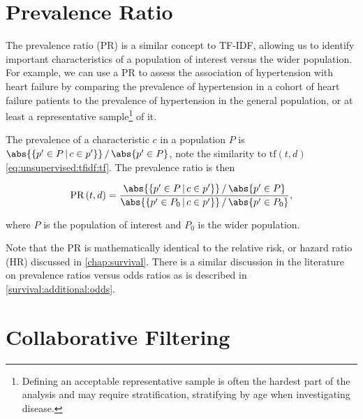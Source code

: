 \section{Prevalence Ratio}
\label{misc:PrevalenceRatio}

The prevalence ratio (PR) is a similar concept to TF-IDF,
allowing us to identify important characteristics of a population of interest versus the wider population.
For example, we can use a PR to assess the association of hypertension with heart failure by comparing
the prevalence of hypertension in a cohort of heart failure patients
to the prevalence of hypertension in the general population,
or at least a representative sample\footnote{Defining an acceptable representative sample is often the hardest part of the analysis and may require stratification, \eg stratifying by age when investigating disease.} of it.

The prevalence of a characteristic $c$ in a population $P$ is $\abs{\{p' \in P \, | \, c \in p'\}} \, / \, \abs{p' \in P}$,
note the similarity to $\text{tf}\left(t,d\right)$ \cref{eq:unsupervised:tfidf:tf}.
The prevalence ratio is then

\begin{equation}\label{eq:unsupervised:PR}
\text{PR}\left(t,d\right) = \frac{ \abs{\{p' \in P \, | \, c \in p'\}} \, / \, \abs{p' \in P} }{ \abs{\{p' \in P_{0} \, | \, c \in p'\}} \, / \, \abs{p' \in P_{0}} },
\end{equation}

\noindent where $P$ is the population of interest and $P_{0}$ is the wider population.

Note that the PR is mathematically identical to the relative risk, or hazard ratio (HR) discussed in \cref{chap:survival}.
There is a similar discussion in the literature \cite{pmid27460748,10.3389/fvets.2017.00193}
on prevalence ratios versus odds ratios as is described in \cref{survival:additional:odds}.


\section{Collaborative Filtering}
\label{misc:CF}

